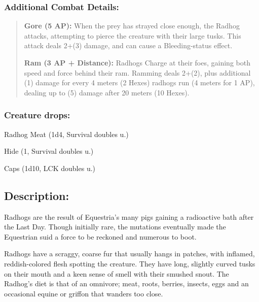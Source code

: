 \documentclass[11pt,a4paper,twocolumn]{book}
\begin{document}
	\subsubsection*{Additional Combat Details:}
	\begin{verse}
		\textbf{Gore (5 AP):} When the prey has strayed close enough, the Radhog attacks, attempting to pierce the creature with their large tusks. This attack deals 2+(3) damage, and can cause a Bleeding-status effect. 
		
		\textbf{Ram (3 AP + Distance):} Radhogs Charge at their foes, gaining both speed and force behind their ram. Ramming deals 2+(2), plus additional (1) damage for every 4 meters (2 Hexes) radhogs run (4 meters for 1 AP), dealing up to (5) damage after 20 meters (10 Hexes). 
		
		
%		
	\end{verse}
	
	\subsubsection*{Creature drops:}
	\begin{compactitem}
		\item Radhog Meat (1d4, Survival doubles u.)
		\item Hide (1, Survival doubles u.)
		\item Caps (1d10, LCK doubles u.)
	\end{compactitem}
	
	
	
	
	\subsection*{Description:}
	Radhogs are the result of Equestria's many pigs gaining a radioactive bath after the Last Day. Though initially rare, the mutations eventually made the Equestrian suid a force to be reckoned and numerous to boot.
	
	Radhogs have a scraggy, coarse fur that usually hangs in patches, with inflamed, reddish-colored flesh spotting the creature. They have long, slightly curved tusks on their mouth and a keen sense of smell with their smushed snout. The Radhog's diet is that of an omnivore; meat, roots, berries, insects, eggs and an occasional equine or griffon that wanders too close.
	
\end{document}
